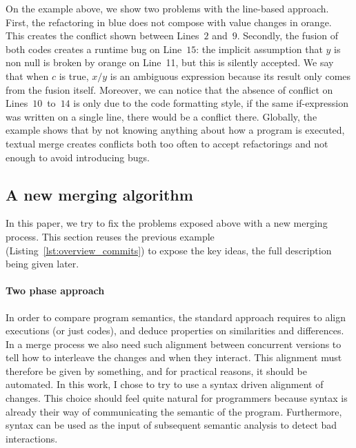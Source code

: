 \documentclass[a4paper,11pt]{article}
\begin{document}
On the example above, we show two problems with the line-based
approach. First, the refactoring in blue does not compose with value
changes in orange. This creates the conflict shown between Lines~$2$ and~$9$. Secondly, the fusion of
both codes creates a runtime bug on Line~$15$: the implicit assumption
that $y$ is non null is broken by orange on Line~11, but this is
silently accepted. We say that when $c$ is true, $x / y$ is an
ambiguous expression because its result only comes from the fusion
itself. Moreover, we can notice that the absence of conflict on
Lines~$10$~to~$14$ is only due to the code formatting style, if the
same if-expression was written on a single line, there would be a
conflict there. Globally, the example shows that by not knowing
anything about how a program is executed, textual merge creates
conflicts both too often to accept refactorings and not enough to
avoid introducing bugs.

\subsection{A new merging algorithm}
In this paper, we try to fix the problems exposed above with a new merging process.
This section reuses the previous example (Listing~\ref{lst:overview_commits}) to expose the key ideas, the full description being given later.

\paragraph{Two phase approach}
In order to compare program semantics, the standard approach requires to align executions (or just codes), and deduce properties on similarities and differences. In a merge process we also need such alignment between concurrent versions to tell how to interleave the changes and when they interact. This alignment must therefore be given by something, and for practical reasons, it should be automated. In this work, I chose to try to use a syntax driven alignment of changes. This choice should feel quite natural for programmers because syntax is already their way of communicating the semantic of the program. Furthermore, syntax can be used as the input of subsequent semantic analysis to detect bad interactions.
\end{document}
